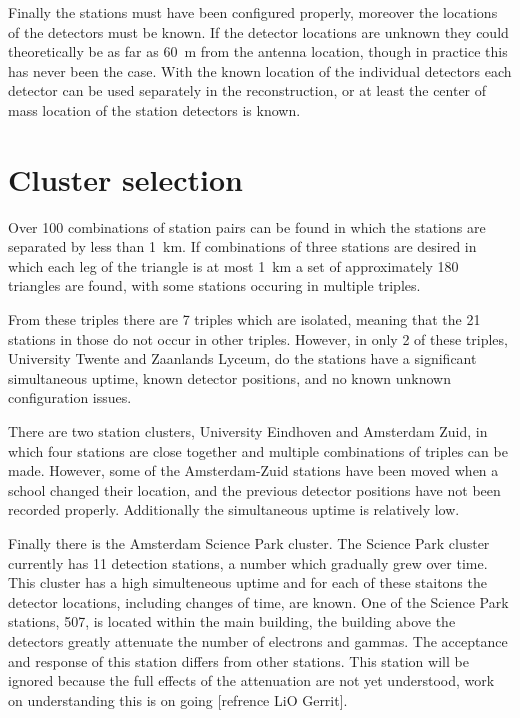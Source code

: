 Finally the stations must have been configured properly, moreover the locations of the detectors must be known. If the detector locations are unknown they could theoretically be as far as \SI{60}{\meter} from the \gps antenna location, though in practice this has never been the case. With the known location of the individual detectors each detector can be used separately in the reconstruction, or at least the center of mass location of the station detectors is known.


\section{Cluster selection}

Over \num{100} combinations of \hisparc station pairs can be found in which the stations are separated by less than \SI{1}{\kilo\meter}. If combinations of three stations are desired in which each leg of the triangle is at most \SI{1}{\kilo\meter} a set of approximately \num{180} triangles are found, with some stations occuring in multiple triples.

From these triples there are \num{7} triples which are isolated, meaning that the \num{21} stations in those do not occur in other triples. However, in only \num{2} of these triples, University Twente and Zaanlands Lyceum, do the stations have a significant simultaneous uptime, known detector positions, and no known unknown configuration issues.

There are two station clusters, University Eindhoven and Amsterdam Zuid, in which four stations are close together and multiple combinations of triples can be made. However, some of the Amsterdam-Zuid stations have been moved when a school changed their location, and the previous detector positions have not been recorded properly. Additionally the simultaneous uptime is relatively low.

Finally there is the Amsterdam Science Park cluster. The Science Park cluster currently has \num{11} detection stations, a number which gradually grew over time. This cluster has a high simulteneous uptime and for each of these staitons the detector locations, including changes of time, are known. One of the Science Park stations, 507, is located within the main \nikhef building, the building above the detectors greatly attenuate the number of electrons and gammas. The acceptance and response of this station differs from other stations. This station will be ignored because the full effects of the attenuation are not yet understood, work on understanding this is on going [refrence LiO Gerrit].

